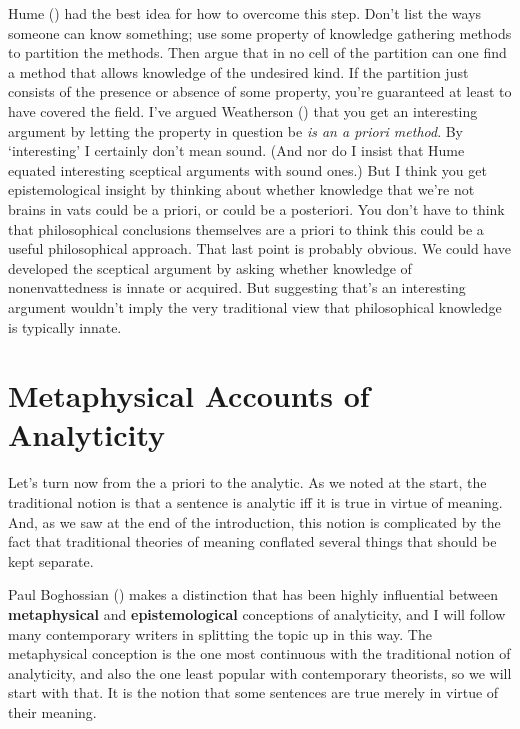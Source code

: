 \documentclass[
  10pt,
  letterpaper,
  DIV=11,
  numbers=noendperiod,
  twoside]{scrartcl}
\begin{document}
Hume () had the best idea for how
to overcome this step. Don't list the ways someone can know something;
use some property of knowledge gathering methods to partition the
methods. Then argue that in no cell of the partition can one find a
method that allows knowledge of the undesired kind. If the partition
just consists of the presence or absence of some property, you're
guaranteed at least to have covered the field. I've argued Weatherson
() that you get an interesting
argument by letting the property in question be \emph{is an a priori
method}. By `interesting' I certainly don't mean sound. (And nor do I
insist that Hume equated interesting sceptical arguments with sound
ones.) But I think you get epistemological insight by thinking about
whether knowledge that we're not brains in vats could be a priori, or
could be a posteriori. You don't have to think that philosophical
conclusions themselves are a priori to think this could be a useful
philosophical approach. That last point is probably obvious. We could
have developed the sceptical argument by asking whether knowledge of
nonenvattedness is innate or acquired. But suggesting that's an
interesting argument wouldn't imply the very traditional view that
philosophical knowledge is typically innate.

\section{Metaphysical Accounts of
Analyticity}\label{metaphysicalaccountsofanalyticity}

Let's turn now from the a priori to the analytic. As we noted at the
start, the traditional notion is that a sentence is analytic iff it is
true in virtue of meaning. And, as we saw at the end of the
introduction, this notion is complicated by the fact that traditional
theories of meaning conflated several things that should be kept
separate.

Paul Boghossian () makes a
distinction that has been highly influential between
\textbf{metaphysical} and \textbf{epistemological} conceptions of
analyticity, and I will follow many contemporary writers in splitting
the topic up in this way. The metaphysical conception is the one most
continuous with the traditional notion of analyticity, and also the one
least popular with contemporary theorists, so we will start with that.
It is the notion that some sentences are true merely in virtue of their
meaning.
\end{document}
